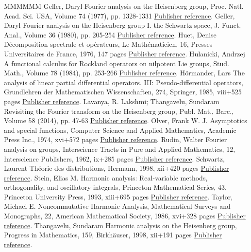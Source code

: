 \begin{thebibliography}{MMMMMM}
 Geller, Daryl Fourier analysis on the Heisenberg group, Proc. Natl. Acad. Sci. USA, Volume 74 (1977), pp. 1328-1331 \href{https://ahl.centre-mersenne.org/item/AHL_2018__1__1_0/#geller}{Publisher reference}.
 Geller, Daryl Fourier analysis on the Heisenberg group I. the Schwartz space, J. Funct. Anal., Volume 36 (1980), pp. 205-254 \href{https://ahl.centre-mersenne.org/item/AHL_2018__1__1_0/#geller2}{Publisher reference}.
 Huet, Denise Décomposition spectrale et opérateurs, Le Mathématicien, 16, Presses Universitaires de France, 1976, 147 pages \href{https://ahl.centre-mersenne.org/item/AHL_2018__1__1_0/#huet}{Publisher reference}.
 Hulanicki, Andrzej A functional calculus for Rockland operators on nilpotent Lie groups, Stud. Math., Volume 78 (1984), pp. 253-266 \href{https://ahl.centre-mersenne.org/item/AHL_2018__1__1_0/#hula}{Publisher reference}.
 Hörmander, Lars The analysis of linear partial differential operators. III: Pseudo-differential operators, Grundlehren der Mathematischen Wissenschaften, 274, Springer, 1985, viii+525 pages \href{https://ahl.centre-mersenne.org/item/AHL_2018__1__1_0/#H}{Publisher reference}.
 Lavanya, R. Lakshmi; Thangavelu, Sundaram Revisiting the Fourier transform on the Heisenberg group, Publ. Mat., Barc., Volume 58 (2014), pp. 47-63 \href{https://ahl.centre-mersenne.org/item/AHL_2018__1__1_0/#thangavelu2}{Publisher reference}.
 Olver, Frank W. J. Asymptotics and special functions, Computer Science and Applied Mathematics, Academic Press Inc., 1974, xvi+572 pages \href{https://ahl.centre-mersenne.org/item/AHL_2018__1__1_0/#O}{Publisher reference}.
 Rudin, Walter Fourier analysis on groups, Interscience Tracts in Pure and Applied Mathematics, 12, Interscience Publishers, 1962, ix+285 pages \href{https://ahl.centre-mersenne.org/item/AHL_2018__1__1_0/#rudin}{Publisher reference}.
 Schwartz, Laurent Théorie des distributions, Hermann, 1998, xii+420 pages \href{https://ahl.centre-mersenne.org/item/AHL_2018__1__1_0/#S}{Publisher reference}.
 Stein, Elias M. Harmonic analysis: Real-variable methods, orthogonality, and oscillatory integrals, Princeton Mathematical Series, 43, Princeton University Press, 1993, xiii+695 pages \href{https://ahl.centre-mersenne.org/item/AHL_2018__1__1_0/#stein2}{Publisher reference}.
 Taylor, Michael E. Noncommutative Harmonic Analysis, Mathematical Surveys and Monographs, 22, American Mathematical Society, 1986, xvi+328 pages \href{https://ahl.centre-mersenne.org/item/AHL_2018__1__1_0/#taylor1}{Publisher reference}.
 Thangavelu, Sundaram Harmonic analysis on the Heisenberg group, Progress in Mathematics, 159, Birkhäuser, 1998, xii+191 pages \href{https://ahl.centre-mersenne.org/item/AHL_2018__1__1_0/#thangavelu}{Publisher reference}.
\end{thebibliography}
